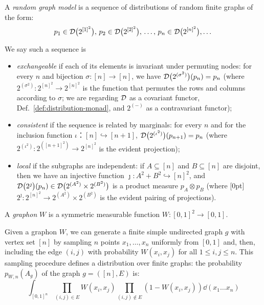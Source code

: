 \begin{definition}[e.g.~{\cite[\S11.2.1]{MR3012035}}]\label{def:rgm}
  A \emph{random graph model} is a sequence of distributions of random finite graphs of the form:
\begin{equation*}
  p_1\in \mathcal{D}\big(2^{[1]^2}\big),\,
  p_2\in \mathcal{D}\big(2^{[2]^2}\big),\,
  \dots,\, 
  p_n\in \mathcal{D}\big(2^{[n]^2}\big),
  \dots 
\end{equation*}

We say such a sequence is
\begin{itemize}
\item \emph{exchangeable} if each of its elements is invariant under permuting nodes:
  for every $n$ and bijection $\sigma \colon [n]\to [n]$, we have 
  $\mathcal{D}\big(2^{(\sigma^2)}\big)(p_n)=p_n$ (where
  $2^{(\sigma^2)}: 2^{[n]^2}\to 2^{[n]^2}$ is the function that
  permutes the rows and columns according to $\sigma$;
  we are regarding $\mathcal{D}$ as a covariant functor, Def.~\ref{def:distribution-monad}, and $2^{(-)}$ as a contravariant functor);
\item \emph{consistent} if the sequence is related by marginals:
  for every $n$ and for the inclusion function $\iota：[n] ↪ [n+1]$,
  $\mathcal{D}\big(2^{(\iota^2)}\big)(p_{n+1})=p_n$ (where
  $2^{(\iota^2)}:2^{([n+1]^2)}\to 2^{[n]^2}$ is the evident projection);
\item \emph{local} if the subgraphs are independent:
  if $A \subseteq [n]$ and $B \subseteq [n]$ are disjoint,
  then we have an injective function ${\jmath\colon A^2 + B^2\hookrightarrow [n]^2}$, and
  $\mathcal{D}\big(2^{\jmath}\big)(p_{n})\in \mathcal{D}\big(2^{(A^2)}\times 2^{(B^2)}\big)$
  is a product measure $p_A\otimes p_B$
(where \raisebox{0pt}[0pt]{$2^{\jmath}:2^{[n]^2}\to 2^{(A^2)}\times 2^{(B^2)}$} is
the evident pairing of projections).

\end{itemize}
\end{definition}

 \begin{definition}[e.g.~\cite{MR3012035}]
        A \emph{graphon} $W$ is a symmetric measurable function $W : [0,1]^2 \to [0,1]$.
\end{definition}
\newcommand{\graphonrgm}[3]{p_{#1,#2}(A_{#3})}
Given a graphon $W$, we can generate a finite simple undirected graph
$g$ with vertex set $[n]$ by sampling $n$ points $x_1, \ldots, x_n$
uniformly from $[0,1]$ and, then, including the edge $(i, j)$ with
probability $W(x_i, x_j)$ for all $1 ≤ i, j ≤ n$. This sampling
procedure defines a distribution over finite graphs: the probability
$\graphonrgm W n g$ of the graph $g = ([n], E)$ is:
%
\begin{equation}\int_{[0,1]^n} 
\!\prod_{(i,j) ∈ E} \!\!\! W(x_i, x_j) 
\prod_{(i,j) ∉ E} \!\!\!\! \left(1 - W(x_i, x_j) \right)
\dd(x_1\ldots x_n)\label{eqn:pwg}\end{equation}

